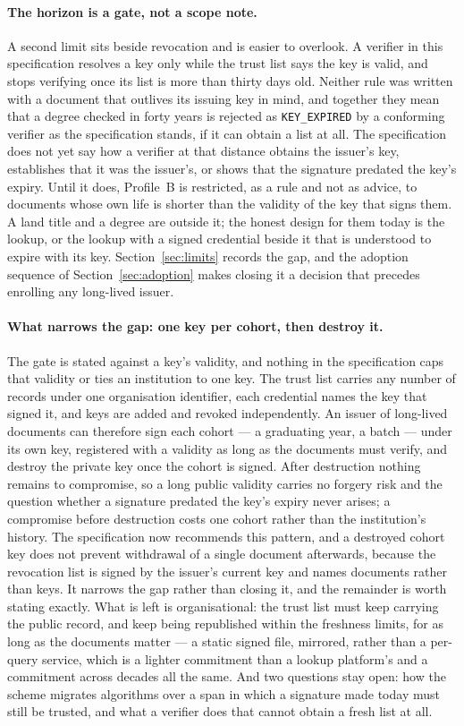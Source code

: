 \documentclass[10pt,a4paper,twocolumn]{article}
\newcommand{\code}[1]{\texttt{\small #1}}
\begin{document}
\paragraph{The horizon is a gate, not a scope note.} A second limit sits beside
revocation and is easier to overlook. A verifier in this specification resolves
a key only while the trust list says the key is valid, and stops verifying once
its list is more than thirty days old. Neither rule was written with a document
that outlives its issuing key in mind, and together they mean that a degree
checked in forty years is rejected as \code{KEY\_EXPIRED} by a conforming
verifier as the specification stands, if it can obtain a list at all. The
specification does not yet say how a verifier at that distance obtains the
issuer's key, establishes that it was the issuer's, or shows that the signature
predated the key's expiry. Until it does, Profile~B is restricted, as a rule and
not as advice, to documents whose own life is shorter than the validity of the
key that signs them. A land title and a degree are outside it; the honest design
for them today is the lookup, or the lookup with a signed credential beside it
that is understood to expire with its key. Section~\ref{sec:limits} records the
gap, and the adoption sequence of Section~\ref{sec:adoption} makes closing it a
decision that precedes enrolling any long-lived issuer.

\paragraph{What narrows the gap: one key per cohort, then destroy it.}
The gate is stated against a key's validity, and nothing in the specification
caps that validity or ties an institution to one key. The trust list carries
any number of records under one organisation identifier, each credential
names the key that signed it, and keys are added and revoked independently.
An issuer of long-lived documents can therefore sign each cohort --- a
graduating year, a batch --- under its own key, registered with a validity as
long as the documents must verify, and destroy the private key once the
cohort is signed. After destruction nothing remains to compromise, so a long
public validity carries no forgery risk and the question whether a signature
predated the key's expiry never arises; a compromise before destruction costs
one cohort rather than the institution's history. The specification now
recommends this pattern, and a destroyed cohort key does not prevent
withdrawal of a single document afterwards, because the revocation list is
signed by the issuer's current key and names documents rather than keys. It narrows the gap rather than closing it, and the
remainder is worth stating exactly. What is left is organisational: the trust
list must keep carrying the public record, and keep being republished within
the freshness limits, for as long as the documents matter --- a static signed
file, mirrored, rather than a per-query service, which is a lighter commitment
than a lookup platform's and a commitment across decades all the same. And
two questions stay open: how the scheme migrates algorithms over a span in
which a signature made today must still be trusted, and what a verifier does
that cannot obtain a fresh list at all.
\end{document}
